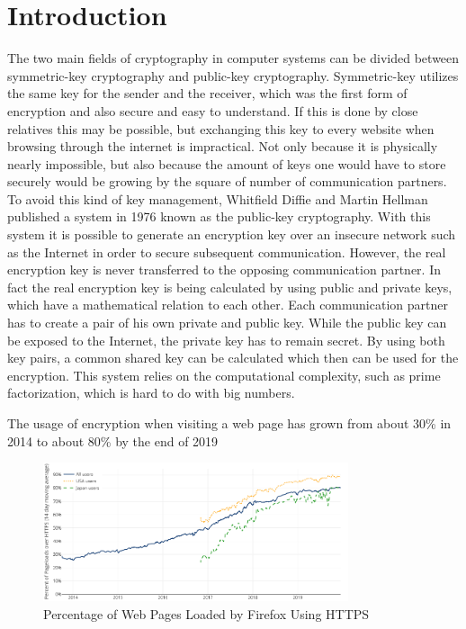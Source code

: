 \documentclass[12pt,oneside,a4paper,parskip]{scrbook}
\begin{document}
\mainmatter

\chapter{Introduction}\label{ch:intro}

The two main fields of cryptography in computer systems can be divided between symmetric-key cryptography and public-key cryptography. Symmetric-key utilizes the same key for the sender and the receiver, which was the first form of encryption and also secure and easy to understand. If this is done by close relatives this may be possible, but exchanging this key to every website when browsing through the internet is impractical. Not only because it is physically nearly impossible, but also because the amount of keys one would have to store securely would be growing by the square of number of communication partners.
To avoid this kind of key management, Whitfield Diffie and Martin Hellman published a system in 1976 known as the public-key cryptography. With this system it is possible to generate an encryption key over an insecure network such as the Internet in order to secure subsequent communication. However, the real encryption key is never transferred to the opposing communication partner. In fact the real encryption key is being calculated by using public and private keys, which have a mathematical relation to each other. Each communication partner has to create a pair of his own private and public key. While the public key can be exposed to the Internet, the private key has to remain secret. 
By using both key pairs, a common shared key can be calculated which then can be used for the encryption. This system relies on the computational complexity, such as prime factorization, which is hard to do with big numbers. 

The usage of encryption when visiting a web page has grown from about 30\% in 2014 to about 80\% by the end of 2019

\begin{figure}[h]
	\centering
  \includegraphics[width=0.8\textwidth]{ressources/https_statistics.png}
	\caption{Percentage of Web Pages Loaded by Firefox Using HTTPS}
\end{figure}
\end{document}
